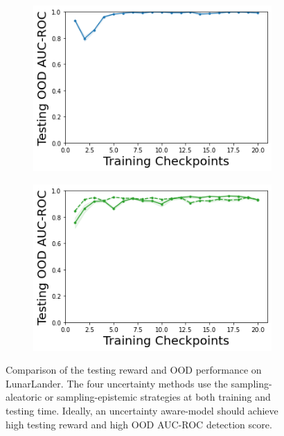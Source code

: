 \begin{figure}
\begin{subfigure}{.2\textwidth}
        \includegraphics[width=\textwidth]{sections/011_icml2022/resources/DKL-LunarLanderOOD-v0-AUC-ROC-epistemic_-testing-strategy.png}
    \end{subfigure}
    \begin{subfigure}{.2\textwidth}
        \includegraphics[width=\textwidth]{sections/011_icml2022/resources/PostNet-LunarLanderOOD-v0-AUC-ROC-epistemic_-testing-strategy.png}
    \end{subfigure}
    \caption{Comparison of the testing reward and OOD performance on LunarLander. The four uncertainty methods use the sampling-aleatoric or sampling-epistemic strategies at both training and testing time. Ideally, an uncertainty aware-model should achieve high testing reward and high OOD AUC-ROC detection score.}
    \label{fig:strategy-testing-performance-lunarlander}
\end{figure}